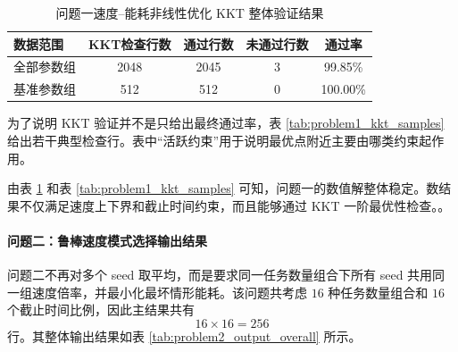 \begin{table}[H]
	\centering
	\caption{问题一速度--能耗非线性优化 KKT 整体验证结果}
	\label{tab:problem1_kkt_overall}
	\footnotesize
	\begin{tabular}{lcccc}
		\hline
		数据范围 & KKT检查行数 & 通过行数 & 未通过行数 & 通过率 \\
		\hline
		全部参数组 & 2048 & 2045 & 3 & 99.85\% \\
		基准参数组 & 512 & 512 & 0 & 100.00\% \\
		\hline
	\end{tabular}
\end{table}

为了说明 KKT 验证并不是只给出最终通过率，表 \ref{tab:problem1_kkt_samples} 给出若干典型检查行。表中“活跃约束”用于说明最优点附近主要由哪类约束起作用。

\begin{table}[H]
	\centering
	\caption{问题一速度--能耗非线性优化 KKT 验证样例}
	\label{tab:problem1_kkt_samples}
	\scriptsize
	\setlength{\tabcolsep}{3pt}
\end{table}

由表 \ref{tab:problem1_kkt_overall} 和表 \ref{tab:problem1_kkt_samples} 可知，问题一的数值解整体稳定。数结果不仅满足速度上下界和截止时间约束，而且能够通过 KKT 一阶最优性检查。。

\paragraph{问题二：鲁棒速度模式选择输出结果}

问题二不再对多个 seed 取平均，而是要求同一任务数量组合下所有 seed 共用同一组速度倍率，并最小化最坏情形能耗。该问题共考虑 $16$ 种任务数量组合和 $16$ 个截止时间比例，因此主结果共有
\[
16\times 16=256
\]
行。其整体输出结果如表 \ref{tab:problem2_output_overall} 所示。

